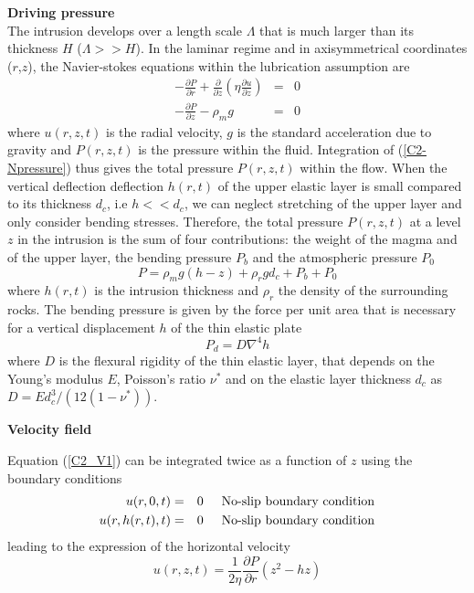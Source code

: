 \textbf{Driving pressure}\\

The  intrusion develops  over a  length scale  $\Lambda$ that  is much
larger than its thickness $H$ ($\Lambda >> H$).  In the laminar regime
and  in   axisymmetrical  coordinates  ($r$,$z$),   the  Navier-stokes
equations within the lubrication assumption are
\begin{eqnarray}
  -\frac{\partial P}{\partial r}  +  \frac{\partial}{\partial z}\left(\eta \frac{\partial u}{\partial z}\right) &=&0\label{C2_V1} \\
  -\frac{\partial P}{\partial z}  - \rho_{m}g&  =&0\label{C2-Npressure}
\end{eqnarray}
where  $u(r,z,t)$  is  the  radial   velocity,  $g$  is  the  standard
acceleration due to gravity and  $P(r,z,t)$ is the pressure within the
fluid.   Integration  of  (\ref{C2-Npressure}) thus  gives  the  total
pressure  $P(r,z,t)$ within  the flow.   When the  vertical deflection
deflection $h(r,t)$  of the upper  elastic layer is small  compared to
its thickness  $d_c$, i.e $h<<d_c$,  we can neglect stretching  of the
upper layer and only consider  bending stresses.  Therefore, the total
pressure $P(r,z,t)$ at a level $z$ in the intrusion is the sum of four
contributions: the  weight of the  magma and  of the upper  layer, the
bending pressure $P_b$ and the atmospheric pressure $P_0$
\begin{equation}
  P = \rho_m g (h-z)+\rho_rgd_c+P_b+P_0
  \label{C2-pression}
\end{equation}
where $h(r,t)$ is the intrusion  thickness and $\rho_r$ the density of
the surrounding rocks. The bending pressure  is given by the force per
unit area  that is necessary  for a  vertical displacement $h$  of the
thin elastic plate \citep{Turcotte:1982ca}
\begin{equation}
  P_d = D\nabla^4h
\end{equation}
where $D$  is the flexural  rigidity of  the thin elastic  layer, that
depends on the Young's modulus $E$, Poisson's ratio $\nu^*$ and on the
elastic           layer          thickness           $d_c$          as
$D = Ed_c^3/\left(12(1-\nu^*)\right)$.

\vspace{.5cm} \textbf{Velocity field} \vspace{.5cm}

Equation (\ref{C2_V1})  can be integrated  twice as a function  of $z$
using the boundary conditions
\begin{eqnarray}
  u(r,0,t) &=& 0 \hspace{.5cm} \text{No-slip boundary condition}\\
  u(r,h(r,t),t) &=& 0 \hspace{.5cm} \text{No-slip boundary condition}
\end{eqnarray}
leading to the expression of the horizontal velocity
\begin{equation}
  u(r,z,t) =\frac{1}{2\eta} \frac{\partial P}{\partial r} \left(z^2-hz\right)
  \label{C2-deriv}
\end{equation}

